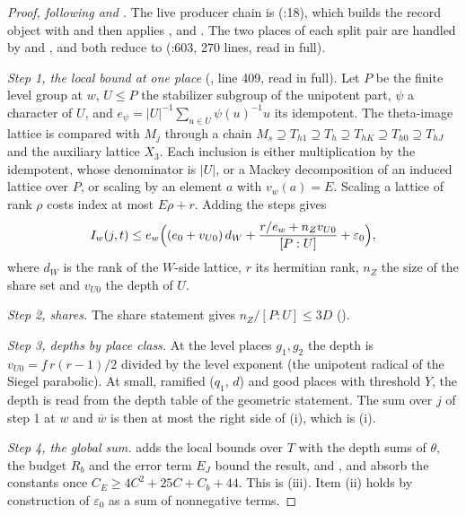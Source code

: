 \documentclass[11pt]{article}
\theoremstyle{remark}
\begin{document}
\begin{proof}[Proof, following  and ]
The live producer chain is  (:18), which builds the record object with  and then applies ,  and . The two places of each split pair are handled by  and , and both reduce to  (:603, 270 lines, read in full).

\emph{Step 1, the local bound at one place} (, line 409, read in full). Let $P$ be the finite level group at $w$, $U\le P$ the stabilizer subgroup of the unipotent part, $\psi$ a character of $U$, and $e_\psi=\lvert U\rvert^{-1}\sum_{u\in U}\psi(u)^{-1}u$ its idempotent. The theta-image lattice is compared with $M_j$ through a chain $M_s\supseteq T_{h1}\supseteq T_h\supseteq T_{hK}\supseteq T_{h0}\supseteq T_{hJ}$ and the auxiliary lattice $X_3$. Each inclusion is either multiplication by the idempotent, whose denominator is $\lvert U\rvert$, or a Mackey decomposition of an induced lattice over $P$, or scaling by an element $a$ with $v_w(a)=E$. Scaling a lattice of rank $\rho$ costs index at most $E\rho+r$. Adding the steps gives
\[
I_w(j,t)\le e_w\Bigl((e_0+v_{U0})\,d_W+\frac{r/e_w+n_Zv_{U0}}{[P:U]}+\varepsilon_0\Bigr),
\]
where $d_W$ is the rank of the $W$-side lattice, $r$ its hermitian rank, $n_Z$ the size of the share set and $v_{U0}$ the depth of $U$.

\emph{Step 2, shares.} The share statement gives $n_Z/[P:U]\le3D$ ().

\emph{Step 3, depths by place class.} At the level places $g_1,g_2$ the depth is $v_{U0}=f\,r(r-1)/2$ divided by the level exponent (the unipotent radical of the Siegel parabolic). At small, ramified ($q_1$, $d$) and good places with threshold $Y$, the depth is read from the depth table of the geometric statement. The sum over $j$ of step 1 at $w$ and $\bar w$ is then at most the right side of (i), which is (i).

\emph{Step 4, the global sum.}  adds the local bounds over $T$ with the depth sums of $\theta$, the budget $R_b$ and the error term $E_J$ bound the result, and ,  and  absorb the constants once $C_E\ge4C^2+25C+C_b+44$. This is (iii). Item (ii) holds by construction of $\varepsilon_0$ as a sum of nonnegative terms.
\end{proof}
\end{document}
